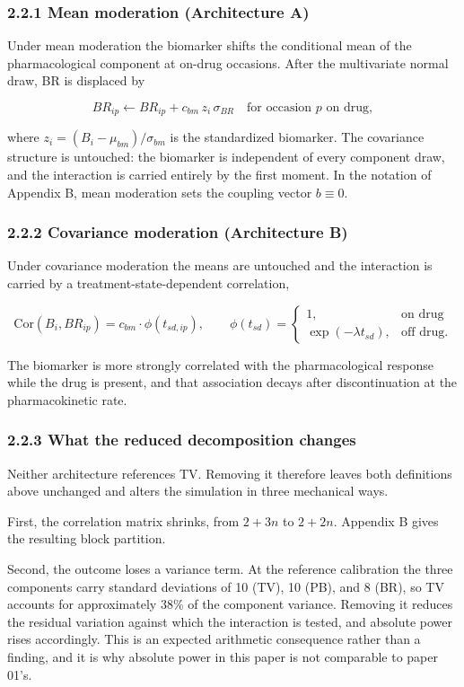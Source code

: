 \documentclass[
  11pt,
]{article}
\begin{document}
\subsubsection{2.2.1 Mean moderation (Architecture A)}

Under mean moderation the biomarker shifts the conditional mean of
the pharmacological component at on-drug occasions. After the
multivariate normal draw, BR is displaced by

\[
BR_{ip} \leftarrow BR_{ip} + c_{bm}\, z_i\, \sigma_{BR}
  \quad \text{for occasion } p \text{ on drug},
\]

where \(z_i = (B_i - \mu_{bm})/\sigma_{bm}\) is the standardized
biomarker. The covariance structure is untouched: the biomarker is
independent of every component draw, and the interaction is carried
entirely by the first moment. In the notation of Appendix B, mean
moderation sets the coupling vector \(b \equiv 0\).

\subsubsection{2.2.2 Covariance moderation (Architecture B)}

Under covariance moderation the means are untouched and the
interaction is carried by a treatment-state-dependent correlation,

\[
\mathrm{Cor}(B_i, BR_{ip}) = c_{bm} \cdot \phi(t_{sd,ip}), \qquad
\phi(t_{sd}) = \begin{cases}
1, & \text{on drug} \\
\exp(-\lambda t_{sd}), & \text{off drug.}
\end{cases}
\]

The biomarker is more strongly correlated with the pharmacological
response while the drug is present, and that association decays after
discontinuation at the pharmacokinetic rate.

\subsubsection{2.2.3 What the reduced decomposition changes}

Neither architecture references TV. Removing it therefore leaves both
definitions above unchanged and alters the simulation in three
mechanical ways.

First, the correlation matrix shrinks, from \(2 + 3n\) to \(2 + 2n\).
Appendix B gives the resulting block partition.

Second, the outcome loses a variance term. At the reference
calibration the three components carry standard deviations of 10
(TV), 10 (PB), and 8 (BR), so TV accounts for approximately 38\% of
the component variance. Removing it reduces the residual variation
against which the interaction is tested, and absolute power rises
accordingly. This is an expected arithmetic consequence rather than a
finding, and it is why absolute power in this paper is not comparable
to paper 01's.
\end{document}
